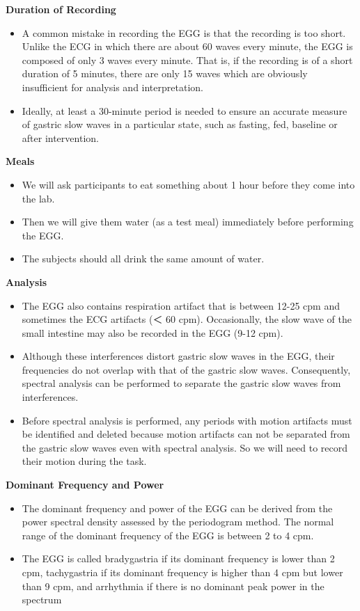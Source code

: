 \documentclass[
]{book}
\providecommand{\tightlist}{%
  \setlength{\itemsep}{0pt}\setlength{\parskip}{0pt}}
\begin{document}
\textbf{Duration of Recording}

\begin{itemize}
\tightlist
\item
  A common mistake in recording the EGG is that the recording is too short. Unlike the ECG in which there are about 60 waves every minute, the EGG is composed of only 3 waves every minute. That is, if the recording is of a short duration of 5 minutes, there are only 15 waves which are obviously insufficient for analysis and interpretation.
\item
  Ideally, at least a 30-minute period is needed to ensure an accurate measure of gastric slow waves in a particular state, such as fasting, fed, baseline or after intervention.
\end{itemize}

\textbf{Meals}

\begin{itemize}
\tightlist
\item
  We will ask participants to eat something about 1 hour before they come into the lab.
\item
  Then we will give them water (as a test meal) immediately before performing the EGG.
\item
  The subjects should all drink the same amount of water.
\end{itemize}

\textbf{Analysis}

\begin{itemize}
\tightlist
\item
  The EGG also contains respiration artifact that is between 12-25 cpm and sometimes the ECG artifacts (＜ 60 cpm). Occasionally, the slow wave of the small intestine may also be recorded in the EGG (9-12 cpm).
\item
  Although these interferences distort gastric slow waves in the EGG, their frequencies do not overlap with that of the gastric slow waves. Consequently, spectral analysis can be performed to separate the gastric slow waves from interferences.
\item
  Before spectral analysis is performed, any periods with motion artifacts must be identified and deleted because motion artifacts can not be separated from the gastric slow waves even with spectral analysis. So we will need to record their motion during the task.
\end{itemize}

\textbf{Dominant Frequency and Power}

\begin{itemize}
\tightlist
\item
  The dominant frequency and power of the EGG can be derived from the power spectral density assessed by the periodogram method. The normal range of the dominant frequency of the EGG is between 2 to 4 cpm.
\item
  The EGG is called bradygastria if its dominant frequency is lower than 2 cpm, tachygastria if its dominant frequency is higher than 4 cpm but lower than 9 cpm, and arrhythmia if there is no dominant peak power in the spectrum
\end{itemize}
\end{document}

